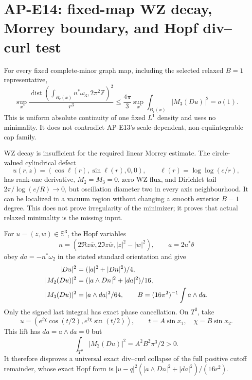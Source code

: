 \section{AP-E14: fixed-map WZ decay, Morrey boundary, and Hopf div--curl test}

For every fixed complete-minor graph map, including the selected relaxed
$B=1$ representative,
\begin{equation}
 \sup_x\frac{\operatorname{dist}(\int_{B_r(x)}u^*\omega_3,
 2\pi^2\mathbb Z)^2}{r^3}
 \leq\frac{4\pi}{3}\sup_x\int_{B_r(x)}|M_3(Du)|^2=o(1).
 \label{eq:e14-wz}
\end{equation}
This is uniform absolute continuity of one fixed $L^1$ density and uses no
minimality.  It does not contradict AP-E13's scale-dependent,
non-equiintegrable cap family.

WZ decay is insufficient for the required linear Morrey estimate.  The
circle-valued cylindrical defect
\begin{equation}
 u(r,z)=(\cos\ell(r),\sin\ell(r),0,0),\qquad
 \ell(r)=\log\log(e/r),
\end{equation}
has rank-one derivative, $M_2=M_3=0$, zero WZ flux, and Dirichlet tail
$2\pi/\log(e/R)\to0$, but oscillation diameter two in every axis
neighbourhood.  It can be localized in a vacuum region without changing a
smooth exterior $B=1$ degree.  This does not prove irregularity of the
minimizer; it proves that actual relaxed minimality is the missing input.

For $u=(z,w)\in\mathbb S^3$, the Hopf variables
\begin{equation}
 n=(2\Re z\bar w,2\Im z\bar w,|z|^2-|w|^2),\qquad
 a=2u^*\theta
\end{equation}
obey $da=-n^*\omega_2$ in the stated standard orientation and give
\begin{align}
 |Du|^2&=(|a|^2+|Dn|^2)/4,\notag\\
 |M_2(Du)|^2&=(|a\wedge Dn|^2+|da|^2)/16,\notag\\
 |M_3(Du)|^2&=|a\wedge da|^2/64,\qquad
 B=(16\pi^2)^{-1}\int a\wedge da.                    \label{eq:e14-hopf}
\end{align}
Only the signed last integral has exact phase cancellation.  On $T^3$, take
\begin{equation}
 u=(e^{i\chi}\cos(t/2),e^{i\chi}\sin(t/2)),\qquad
 t=A\sin x_1,\quad\chi=B\sin x_2 .
\end{equation}
This lift has $da=a\wedge da=0$ but
\begin{equation}
 \int_{T^3}|M_2(Du)|^2=A^2B^2\pi^3/2>0.
\end{equation}
It therefore disproves a universal exact div--curl collapse of the full
positive cutoff remainder, whose exact Hopf form is
$|u-q|^2(|a\wedge Dn|^2+|da|^2)/(16r^2)$.

